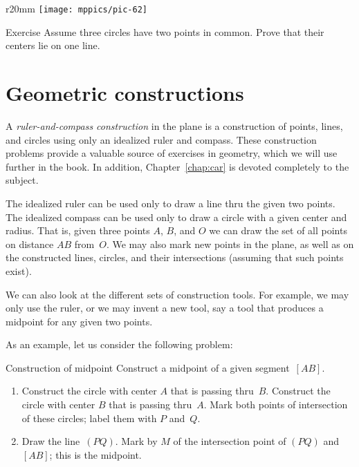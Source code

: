 {

\begin{wrapfigure}{r}{20mm}
\vskip-8mm
\centering
\texttt{[image: mppics/pic-62]}
\end{wrapfigure}

\begin{thm}{Exercise}\label{ex:tangent-circles-3}
Assume three circles have two points in common.
Prove that their centers lie on one line.
\end{thm}

}

\section{Geometric constructions}

A \emph{ruler-and-compass construction} in the plane is a construction of points, lines, and circles using only an idealized ruler and compass.
These construction problems provide a valuable source of exercises in geometry, 
which we will use further in the book.
In addition, Chapter~\ref{chap:car} is devoted completely to the subject.

The idealized ruler can be used only to draw a line thru the given two points.
The idealized compass can be used only to draw a circle with a given center and radius.
That is, given three points $A$, $B$, and $O$ 
we can draw the set of all points on distance $AB$ from~$O$.
We may also mark new points in the plane,
as well as on the constructed lines, circles, 
and their intersections (assuming that such points exist).

We can also look at the different sets of construction tools.
For example,
we may only use the ruler,
or we may invent a new tool, 
say a tool that produces a midpoint for any given two points.

As an example, let us consider the following problem:

\begin{thm}{Construction of midpoint}
Construct a midpoint of a given segment~$[AB]$.
\end{thm}

\begin{enumerate}[1.]
\item Construct the circle 
with center $A$ 
that is passing thru~$B$.
Construct the circle 
with center $B$ 
that is passing thru~$A$.
Mark both points of intersection of these circles; label them with $P$ and~$Q$.
\item Draw the line~$(PQ)$.
Mark by $M$ of the intersection point of $(PQ)$ and $[AB]$; this is the midpoint.
\end{enumerate}

